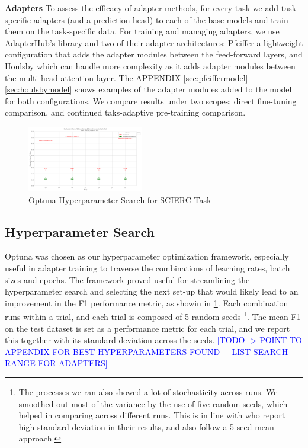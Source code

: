 \documentclass[draft,10pt,twocolumn,letterpaper]{article}
\begin{document}
\textbf{Adapters}  To assess the efficacy of adapter methods, for every task we add task-specific adapters (and a prediction head) to each of the base models and train them on the task-specific data. For training and managing adapters, we use AdapterHub’s library \cite{adapterhub_overview} and two of their adapter architectures: Pfeiffer \cite{pfeiffer2020adapterhub} a lightweight configuration that adds the adapter modules between the feed-forward layers, and Houlsby \cite{houlsby2019parameter} which can handle more complexity as it adds adapter modules between the multi-head attention layer. The APPENDIX \ref{sec:pfeiffermodel} \ref{sec:houlsbymodel} shows examples of the adapter modules added to the model for both configurations. We compare results under two scopes: direct fine-tuning comparison, and continued taks-adaptive pre-training comparison.


\begin{figure}[h]
    \centering 
    \includegraphics[width=0.45\textwidth]{resources/SCIERC/v01/evaluation_macro_f1_across_seeds.png}
    \caption{Optuna Hyperparameter Search for SCIERC Task}
    \label{fig:optuna_search}
\end{figure}


\subsection{Hyperparameter Search} Optuna was chosen as our hyperparameter optimization framework, especially useful in adapter training to traverse the combinations of learning rates, batch sizes and epochs. The framework proved useful for streamlining the hyperparameter search and selecting the next set-up that would likely lead to an improvement in the F1 performance metric, as showin in \ref{fig:optuna_search}. Each combination runs within a trial, and each trial is composed of 5 random seeds \footnote{The processes we ran also showed a lot of stochasticity across runs. We smoothed out most of the variance by the use of five random seeds, which helped in comparing across different runs. This is in line with \cite{allenai_dont_stop_pretraining} who report high standard deviation in their results, and also follow a 5-seed mean approach.}. The mean F1 on the test dataset is set as a performance metric for each trial, and we report this together with its standard deviation across the seeds. \textcolor{blue}{[TODO -> POINT TO APPENDIX FOR BEST HYPERPARAMETERS FOUND + LIST SEARCH RANGE FOR ADAPTERS]}
\end{document}
